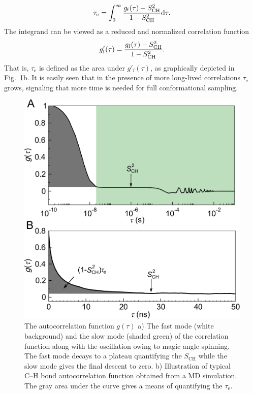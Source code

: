 \documentclass[journal=jpcbfk,manuscript=article,layout=twocolumn]{achemso}
\begin{document}
\begin{equation}
\label{eq:teff}
\tau_\mathrm{e}=\int_{0}^{\infty}\frac{g_{\mathrm{f}}(\tau)-S^{2}_{\rm{CH}}}{1-S^2_{\mathrm{CH}}}\mathrm d\tau.
\end{equation}
The integrand can be viewed as a reduced and normalized correlation function
\begin{equation}
\label{eq:nBCF}
g'_{\mathrm{f}}(\tau)=\frac{g_{\mathrm{f}}(\tau)-S^{2}_{\rm{CH}}}{1-S^2_{\mathrm{CH}}}.
\end{equation}
That is, $\tau_\mathrm e$ is defined as the area under $g'_{\mathrm{f}}(\tau)$, as
graphically depicted in Fig.~\ref{fig:schem_teff}b.
It is easily seen that in the presence of more long-lived correlations $\tau_\mathrm{e}$ grows, signaling that more time is needed for full conformational sampling.  

\begin{figure}[t]
\includegraphics[scale=0.45]{gfun_wg.pdf} 
\caption{The autocorrelation function $g(\tau)$ a) The fast mode (white background) and the slow mode (shaded green) of the correlation function along with the oscillation owing to magic angle spinning. The fast mode decays to a plateau quantifying the $S_{\mathrm{CH}}$ while the slow mode gives the final descent to zero. b) Illustration of typical C--H bond autocorrelation function obtained from a MD simulation. The gray area under the curve gives a means of quantifying the $\tau_\mathrm{e}$. }
\label{fig:schem_teff}

\end{figure} 
\end{document}
